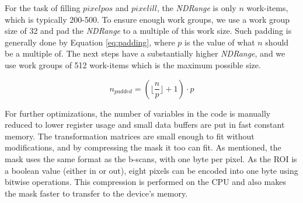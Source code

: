 For the task of filling $pixelpos$ and $pixelill$, the \textit{NDRange} is only $n$ work-items, which is typically 200-500. To ensure enough work groups, we use a work group size of 32 and pad the \textit{NDRange} to a multiple of this work size. Such padding is generally done by Equation \ref{eq:padding}, where $p$ is the value of what $n$ should be a multiple of. The next steps have a substantially higher \textit{NDRange}, and we use work groups of 512 work-items which is the maximum possible size.

\begin{equation}
	\label{eq:padding}
	n_{padded} = (\lfloor \frac{n}{p} \rfloor + 1) \cdot p
\end{equation}

For further optimizations, the number of variables in the code is manually reduced to lower register usage and small data buffers are put in fast constant memory. The transformation matrices are small enough to fit without modifications, and by compressing the mask it too can fit. As mentioned, the mask uses the same format as the b-scans, with one byte per pixel. As the ROI is a boolean value (either in or out), eight pixels can be encoded into one byte using bitwise operations. This compression is performed on the CPU and also makes the mask faster to transfer to the device's memory.